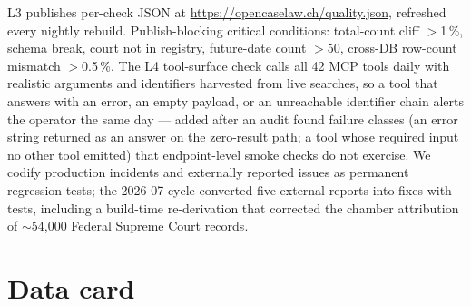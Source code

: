 \documentclass[11pt,a4paper]{article}
\begin{document}
\begin{table}[H]
\centering
\caption{Quality assurance, by layer. L1--L3 are publish-blocking on a critical regression (the orchestrator refuses to advance to the git-push step). L4 is alerting-only.}
\label{tab:qa_layers}
\small
{}
\end{table}

L3 publishes per-check JSON at \url{https://opencaselaw.ch/quality.json}, refreshed every nightly rebuild. Publish-blocking critical conditions: total-count cliff $>$1\,\%, schema break, court not in registry, future-date count $>$50, cross-DB row-count mismatch $>$0.5\,\%. The L4 tool-surface check calls all 42 MCP tools daily with realistic arguments and identifiers harvested from live searches, so a tool that answers with an error, an empty payload, or an unreachable identifier chain alerts the operator the same day --- added after an audit found failure classes (an error string returned as an answer on the zero-result path; a tool whose required input no other tool emitted) that endpoint-level smoke checks do not exercise. We codify production incidents and externally reported issues as permanent regression tests; the 2026-07 cycle converted five external reports into fixes with tests, including a build-time re-derivation that corrected the chamber attribution of $\sim$54{,}000 Federal Supreme Court records.

\section{Data card}\label{sec:datacard}
\end{document}
